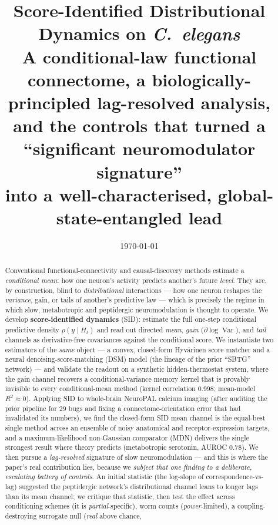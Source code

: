 \documentclass[11pt]{article}
\title{\textbf{Score-Identified Distributional Dynamics on \textit{C.\ elegans}}\\[4pt]
\large A conditional-law functional connectome, a biologically-principled lag-resolved analysis,
and the controls that turned a ``significant neuromodulator signature''\\ into a well-characterised,
global-state-entangled lead}
\author{}
\date{\today}
\newcommand{\Var}{\operatorname{Var}}
\newcommand{\Hcal}{H}
\begin{document}
\maketitle
\vspace{-2.2em}

\begin{abstract}
\noindent
Conventional functional-connectivity and causal-discovery methods estimate a \emph{conditional
mean}: how one neuron's activity predicts another's future \emph{level}. They are, by construction,
blind to \emph{distributional} interactions --- how one neuron reshapes the \emph{variance}, gain,
or tails of another's predictive law --- which is precisely the regime in which slow, metabotropic
and peptidergic neuromodulation is thought to operate. We develop \textbf{score-identified dynamics}
(SID): estimate the full one-step conditional predictive density $\rho(y\mid \Hcal_t)$ and read out
directed \emph{mean}, \emph{gain} ($\partial\log\Var$), and \emph{tail} channels as derivative-free
covariances against the conditional score. We instantiate two estimators of the \emph{same} object
--- a convex, closed-form Hyv\"arinen score matcher and a neural denoising-score-matching (DSM)
model (the lineage of the prior ``SBTG'' network) --- and validate the readout on a synthetic
hidden-thermostat system, where the gain channel recovers a conditional-variance memory kernel that
is provably invisible to every conditional-mean method (kernel correlation $0.998$; mean-model
$R^2\approx 0$). Applying SID to whole-brain NeuroPAL calcium imaging (after auditing the prior
pipeline for 29 bugs and fixing a connectome-orientation error that had invalidated its numbers), we
find the closed-form SID mean channel is the equal-best single method across an ensemble of noisy
anatomical and receptor-expression targets, and a maximum-likelihood non-Gaussian comparator (MDN) delivers the single
strongest result where theory predicts (metabotropic serotonin, AUROC $0.78$). We then pursue a
\emph{lag-resolved} signature of slow neuromodulation --- and this is where the paper's real
contribution lies, because we \emph{subject that one finding to a deliberate, escalating battery of
controls}. An initial statistic (the log-slope of correspondence-vs-lag) suggested the peptidergic
network's distributional channel leans to longer lags than its mean channel; we critique that
statistic, then test the effect across conditioning schemes (it is \emph{partial}-specific),
worm counts (\emph{power}-limited), a coupling-destroying surrogate null (\emph{real} above chance,

\end{abstract}
\end{document}
